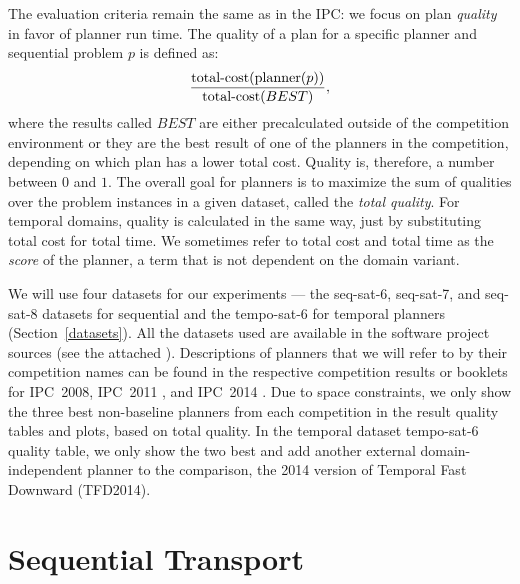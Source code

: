 The evaluation criteria remain the same as in the IPC:
we focus on plan \textit{quality} in favor of planner run time.
The quality of a plan for a specific planner and sequential problem $p$ is defined as:
$$\frac{\textrm{total-cost}(\textrm{planner}(p))}{\textrm{total-cost}(BEST)},$$
where the results called $BEST$
are either precalculated outside of the competition environment or they are the best result of one of the planners in the competition, depending on which plan has a lower total cost.
Quality is, therefore, a number between $0$ and $1$.
The overall goal for planners is to maximize the sum of qualities over the problem instances in a given dataset, called the \textit{total quality}.
For temporal domains, quality is calculated in the same way, just by substituting total cost
for total time. We sometimes refer to total cost and total time as the \textit{score} of the planner, a term that is not dependent on the domain variant.

We will use four datasets for our experiments --- the seq-sat-6, seq-sat-7,
and seq-sat-8 datasets for sequential
and the tempo-sat-6 for temporal planners (Section~\ref{datasets}).
All the datasets used are available in the
software project sources (see the attached ).
Descriptions of planners that we will refer to by their competition names can be found in the respective competition results or booklets for IPC~2008, IPC~2011 \citep{Garcia-Olaya2011}, and IPC~2014 \citep{Vallati2015}.
Due to space constraints, we only show the three
best non-baseline planners from each competition
in the result quality tables and plots, based on total quality.
In the temporal dataset tempo-sat-6 quality table, we only show the two best
and add another external domain-independent planner
to the comparison, the 2014 version of Temporal Fast Downward (TFD2014).






















\section{Sequential Transport}

